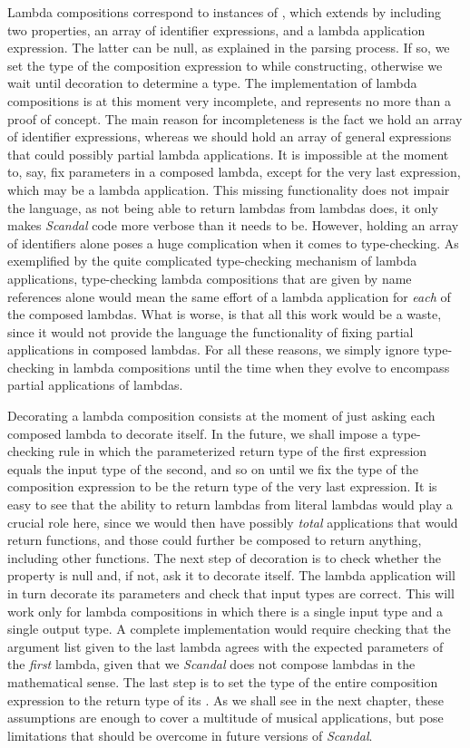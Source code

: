 Lambda compositions correspond to instances of , which extends  by including two properties, an array of identifier expressions, and a lambda application expression. The latter can be null, as explained in the parsing process. If so, we set the type of the composition expression to  while constructing, otherwise we wait until decoration to determine a type. The implementation of lambda compositions is at this moment very incomplete, and represents no more than a proof of concept. The main reason for incompleteness is the fact we hold an array of identifier expressions, whereas we should hold an array of general expressions that could possibly partial lambda applications. It is impossible at the moment to, say, fix parameters in a composed lambda, except for the very last expression, which may be a lambda application. This missing functionality does not impair the language, as not being able to return lambdas from lambdas does, it only makes \emph{Scandal} code more verbose than it needs to be. However, holding an array of identifiers alone poses a huge complication when it comes to type-checking. As exemplified by the quite complicated type-checking mechanism of lambda applications, type-checking lambda compositions that are given by name references alone would mean the same effort of a lambda application for \emph{each} of the composed lambdas. What is worse, is that all this work would be a waste, since it would not provide the language the functionality of fixing partial applications in composed lambdas. For all these reasons, we simply ignore type-checking in lambda compositions until the time when they evolve to encompass partial applications of lambdas.

Decorating a lambda composition consists at the moment of just asking each composed lambda to decorate itself. In the future, we shall impose a type-checking rule in which the parameterized return type of the first expression equals the input type of the second, and so on until we fix the type of the composition expression to be the return type of the very last expression. It is easy to see that the ability to return lambdas from literal lambdas would play a crucial role here, since we would then have possibly \emph{total} applications that would return functions, and those could further be composed to return anything, including other functions. The next step of decoration is to check whether the  property is null and, if not, ask it to decorate itself. The lambda application will in turn decorate its parameters and check that input types are correct. This will work only for lambda compositions in which there is a single input type and a single output type. A complete implementation would require checking that the argument list given to the last lambda agrees with the expected parameters of the \emph{first} lambda, given that we \emph{Scandal} does not compose lambdas in the mathematical sense. The last step is to set the type of the entire composition expression to the return type of its . As we shall see in the next chapter, these assumptions are enough to cover a multitude of musical applications, but pose limitations that should be overcome in future versions of \emph{Scandal}.

